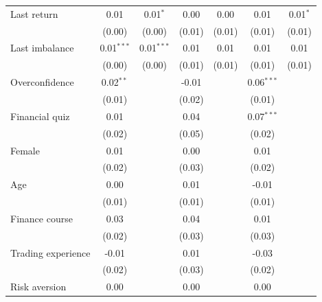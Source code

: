 \begin{tabular}{lcccccc}
   Last return                    & 0.01          & 0.01$^{*}$    & 0.00         & 0.00         & 0.01         & 0.01$^{*}$\\   
                                  & (0.00)        & (0.00)        & (0.01)       & (0.01)       & (0.01)       & (0.01)\\   
   Last imbalance                 & 0.01$^{***}$  & 0.01$^{***}$  & 0.01         & 0.01         & 0.01         & 0.01\\   
                                  & (0.00)        & (0.00)        & (0.01)       & (0.01)       & (0.01)       & (0.01)\\   
   Overconfidence                 & 0.02$^{**}$   &               & -0.01        &              & 0.06$^{***}$ &   \\   
                                  & (0.01)        &               & (0.02)       &              & (0.01)       &   \\   
   Financial quiz                 & 0.01          &               & 0.04         &              & 0.07$^{***}$ &   \\   
                                  & (0.02)        &               & (0.05)       &              & (0.02)       &   \\   
   Female                         & 0.01          &               & 0.00         &              & 0.01         &   \\   
                                  & (0.02)        &               & (0.03)       &              & (0.02)       &   \\   
   Age                            & 0.00          &               & 0.01         &              & -0.01        &   \\   
                                  & (0.01)        &               & (0.01)       &              & (0.01)       &   \\   
   Finance course                 & 0.03          &               & 0.04         &              & 0.01         &   \\   
                                  & (0.02)        &               & (0.03)       &              & (0.03)       &   \\   
   Trading experience             & -0.01         &               & 0.01         &              & -0.03        &   \\   
                                  & (0.02)        &               & (0.03)       &              & (0.02)       &   \\   
   Risk aversion                  & 0.00          &               & 0.00         &              & 0.00         &   \\   

\end{tabular}
